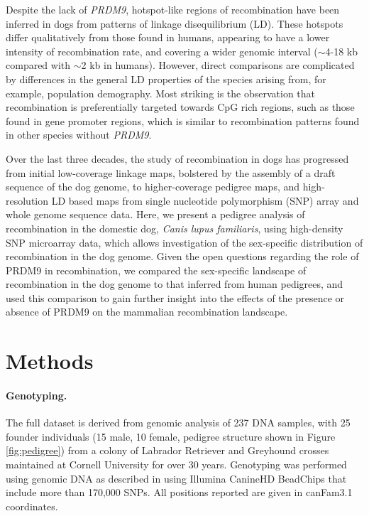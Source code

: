 Despite the lack of \textit{PRDM9}, hotspot-like regions of recombination have been inferred in dogs from patterns of linkage disequilibrium (LD).
These hotspots differ qualitatively from those found in humans, appearing to have a lower intensity of recombination rate, and covering a wider genomic interval ($\sim$4-18 kb compared with $\sim$2 kb in humans)\cite{Axelsson2012,Auton2013}.
However, direct comparisons are complicated by differences in the general LD properties of the species arising from, for example, population demography\cite{Auton2013}.
Most striking is the observation that recombination is preferentially targeted towards CpG rich regions, such as those found in gene promoter regions,
which is similar to recombination patterns found in other species without \textit{PRDM9}.

Over the last three decades, the study of recombination in dogs has progressed from initial low-coverage linkage maps\cite{Mellersh1997,Neff1999}, bolstered by the assembly of a draft sequence of the dog genome\cite{Lindblad-Toh2005}, to higher-coverage pedigree maps\cite{Wong2010}, and high-resolution LD based maps from single nucleotide polymorphism (SNP) array and whole genome sequence data\cite{Axelsson2012,Auton2013}.
Here, we present a pedigree analysis of recombination in the domestic dog, \textit{Canis lupus familiaris}, using high-density SNP microarray data, which allows investigation of the sex-specific distribution of recombination in the dog genome.
Given the open questions regarding the role of PRDM9 in recombination, we compared the sex-specific landscape of recombination in the dog genome to that inferred from human pedigrees, and used this comparison to gain further insight into the effects of the presence or absence of PRDM9 on the mammalian recombination landscape.

\section{Methods}

\paragraph{Genotyping.}
The full dataset is derived from genomic analysis of 237 DNA samples, with 25 founder individuals (15 male, 10 female, pedigree structure shown in Figure \ref{fig:pedigree}) from a colony of Labrador Retriever and Greyhound crosses maintained at Cornell University for over 30 years\cite{Todhunter2003,Mateescu2008,Phavaphutanon2009}.
Genotyping was performed using genomic DNA as described in \citet{Hayward2016} using Illumina CanineHD BeadChips that include more than 170,000 SNPs. 
All positions reported are given in canFam3.1 coordinates.

